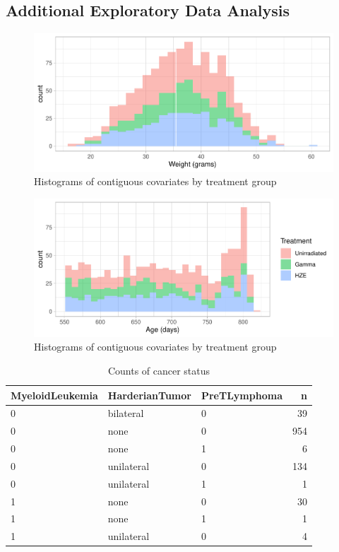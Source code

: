 \documentclass[12pt]{article}
\begin{document}
\hypertarget{additional-exploratory-data-analysis}{%
\subsection{Additional Exploratory Data Analysis}\label{additional-exploratory-data-analysis}}

\label{sec:appeda}

\begin{figure}[H]

{\centering \includegraphics[width=0.42\linewidth]{bookdown_report_files/figure-latex/eda-1} 

}

\caption{Histograms of contiguous covariates by treatment group}\label{fig:eda-1}
\end{figure}
\begin{figure}[H]

{\centering \includegraphics[width=0.42\linewidth]{bookdown_report_files/figure-latex/eda-2} 

}

\caption{Histograms of contiguous covariates by treatment group}\label{fig:eda-2}
\end{figure}

\begin{table}[!h]
\centering
\begin{tabular}{lllr}
  \toprule
MyeloidLeukemia & HarderianTumor & PreTLymphoma & n \\ 
  \midrule
0 & bilateral & 0 &  39 \\ 
  0 & none & 0 & 954 \\ 
  0 & none & 1 &   6 \\ 
  0 & unilateral & 0 & 134 \\ 
  0 & unilateral & 1 &   1 \\ 
  1 & none & 0 &  30 \\ 
  1 & none & 1 &   1 \\ 
  1 & unilateral & 0 &   4 \\ 
   \bottomrule
\end{tabular}
\caption{Counts of cancer status} 
\end{table}
\end{document}
